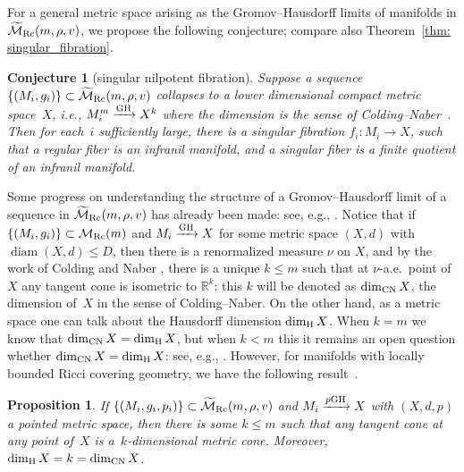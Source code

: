 \documentclass[pdftex]{sigma}
\numberwithin{equation}{section}
\newtheorem{Proposition}[Theorem]{Proposition}
\newtheorem{Conjecture}[Theorem]{Conjecture}
\DeclareMathOperator{\diam}{diam}
\begin{document}
For a general metric space arising as the Gromov--Hausdorff limits of
manifolds in \linebreak $\widetilde{\mathcal{M}}_{\rm Rc}(m,\rho,v)$, we propose the following
conjecture; compare also Theorem~\ref{thm: singular_fibration}.
\begin{Conjecture}[singular nilpotent fibration] Suppose a sequence
$ \{(M_i,g_i) \}\subset \widetilde{\mathcal{M}}_{\rm Rc}(m,\rho,v)$
collapses to a lower dimensional compact metric space~$X$, i.e.,
$M^m_i\xrightarrow{\rm GH} X^k$ where the dimension is the sense of Colding--Naber~{\rm \cite{CN12}}. Then for each~$i$ sufficiently large, there is a singular
fibration $f_i \colon M_i\to X$, such that a regular fiber is an infranil manifold,
and a singular fiber is a finite quotient of an infranil manifold.
\end{Conjecture}
Some progress on understanding the structure of a Gromov--Hausdorff limit of a
sequence in $\widetilde{\mathcal{M}}_{\rm Rc}(m,\rho,v)$ has already been made:
see, e.g., \cite{HR20}. Notice that if $ \{(M_i,g_i) \}\subset
\mathcal{M}_{\rm Rc}(m)$ and $M_i\xrightarrow{\rm GH}X$ for some metric space $(X,d)$
with $\diam (X,d)\le D$, then there is a renormalized measure $\nu$ on $X$, and
by the work of Colding and Naber \cite{CN12}, there is a unique $k\le m$ such
that at $\nu$-a.e.\ point of $X$ any tangent cone is isometric to
$\mathbb{R}^k$: this $k$ will be denoted as $\dim_{\rm CN}X$, the dimension of~$X$
in the sense of Colding--Naber. On the other hand, as a metric space one can
talk about the Hausdorff dimension $\dim_{\rm H}X$. When $k=m$ we know that
$\dim_{\rm CN}X=\dim_{\rm H}X$, but when $k<m$ this it remains an open question whether
$\dim_{\rm CN}X=\dim_{\rm H}X$: see, e.g., \cite[Open Question~1.11]{KL18}.
However, for manifolds with locally bounded Ricci covering
geometry, we have the following result~\cite{Rong18}.
\begin{Proposition}
If $ \{(M_i,g_i,p_i) \}\subset \widetilde{\mathcal{M}}_{\rm Rc}(m,\rho,v)$
and $M_i\xrightarrow{p{\rm GH}}X$ with $(X,d,p)$ a pointed metric space, then
there is some $k\le m$ such that any tangent cone at any point of~$X$ is
a~$k$-dimensional metric cone. Moreover, $\dim_{\rm H}X=k=\dim_{\rm CN}X$.
\end{Proposition}
\end{document}
